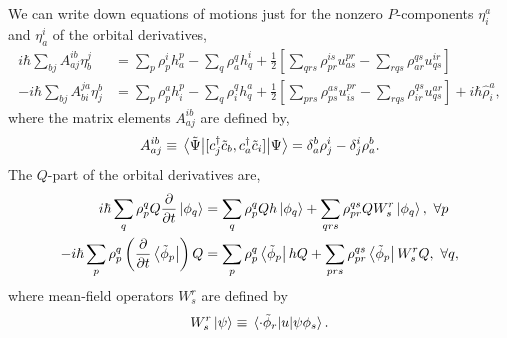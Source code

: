 We can write down equations of motions just for the nonzero $P$-components
$\eta^a_i$ and $\eta^i_a$ of the orbital derivatives,
\begin{align}
    i\hbar \sum_{bj}A^{ib}_{aj}\eta^j_b 
        &= \sum_p \rho^i_p h^p_a - \sum_q \rho^q_a h^i_q
        + \frac{1}{2}\left[ 
              \sum_{qrs} \rho^{is}_{pr} u^{pr}_{as}
            - \sum_{rqs} \rho^{qs}_{ar} u^{ir}_{qs}     
        \right] \\
    - i\hbar \sum_{bj} A^{ja}_{bi}\eta^b_j 
        &= \sum_p \rho^a_p h^p_i - \sum_q \rho^q_i h^a_q
        + \frac{1}{2} \left[
              \sum_{prs} \rho^{as}_{ps} u^{pr}_{is}
            - \sum_{rqs} \rho^{qs}_{ir} u^{ar}_{qs}
        \right]
        + i\hbar \hat{\rho}_i^a,
\end{align}
where the matrix elements $A^{ib}_{aj}$ are defined by,
\begin{equation}
    A^{ib}_{aj} \equiv 
    \mel{\tilde{\Psi}}{[c^\dagger_j\tilde{c}_b, c^\dagger_a\tilde{c}_i]}{\Psi}
    = \delta^b_a\rho^i_j - \delta^i_j\rho^b_a.
\end{equation}
The $Q$-part of the orbital derivatives are,
\begin{align}
    i\hbar\sum_q \rho^q_p Q \frac{\partial}{\partial t} \ket{\phi_q}
        &= \sum_q \rho^q_p Q h\ket{\phi_q}
        + \sum_{qrs} \rho^{qs}_{pr}Q W^r_s\ket{\phi_q}, \ \forall p \\
    -i\hbar\sum_p \rho^q_p \left(\frac{\partial}{\partial t}\bra{\tilde{\phi}_p} \right)Q
        &= \sum_p\rho^q_p \bra{\tilde{\phi}_p}hQ
        + \sum_{prs} \rho^{qs}_{pr} \bra{\tilde{\phi}_p}W^r_s Q, \ \forall q,
\end{align}
where mean-field operators $W^r_s$ are defined by 
\begin{equation}
    W^r_s\ket{\psi} \equiv 
    \mel*{\cdot \tilde{\phi}_r}{u}{\psi\phi_s}.
\end{equation}

